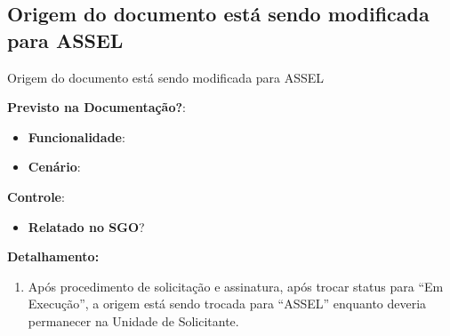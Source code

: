 \subsection{Origem do documento está sendo modificada para ASSEL}
\begin{falha}[1]{Origem do documento está sendo modificada para ASSEL}


	\textbf{Previsto na Documentação?}: \mschecksim
	\begin{itemize}
		\item \textbf{Funcionalidade}: \sosFu
		\item \textbf{Cenário}: \sosFuCut
	\end{itemize}

	
	\textbf{Controle}:
	\begin{itemize}
		\item \textbf{Relatado no SGO}? \mschecksim 
	\end{itemize}
	
	
	\tcblower
	
	\textbf{Detalhamento:}
	\begin{enumerate}
		\item Após procedimento de solicitação e assinatura, após trocar status para ``Em Execução'', a origem está sendo trocada para ``ASSEL'' enquanto deveria permanecer na Unidade de Solicitante.
	\end{enumerate}
	
\end{falha}


